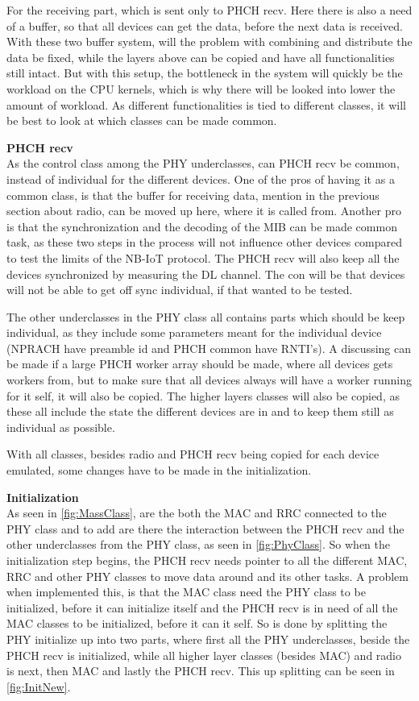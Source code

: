 For the receiving part, which is sent only to PHCH recv. Here there is also a need of a buffer, so that all devices can get the data, before the next data is received. 
With these two buffer system, will the problem with combining and distribute the data be fixed, while the layers above can be copied and have all functionalities still intact. But with this setup, the bottleneck in the system will quickly be the workload on the CPU kernels, which is why there will be looked into lower the amount of workload. As different functionalities is tied to different classes, it will be best to look at which classes can be made common.

\textbf{PHCH recv}\\
As the control class among the PHY underclasses, can PHCH recv be common, instead of individual for the different devices. One of the pros of having it as a common class, is that the buffer for receiving data, mention in the previous section about radio, can be moved up here, where it is called from. Another pro is that the synchronization and the decoding of the MIB can be made common task, as these two steps in the process will not influence other devices compared to test the limits of the NB-IoT protocol. The PHCH recv will also keep all the devices synchronized by measuring the DL channel. The con will be that devices will not be able to get off sync individual, if that wanted to be tested.

The other underclasses in the PHY class all contains parts which should be keep individual, as they include some parameters meant for the individual device (NPRACH have preamble id and PHCH common have RNTI's). A discussing can be made if a large PHCH worker array should be made, where all devices gets workers from, but to make sure that all devices always will have a worker running for it self, it will also be copied. The higher layers classes will also be copied, as these all include the state the different devices are in and to keep them still as individual as possible. 

With all classes, besides radio and PHCH recv being copied for each device emulated, some changes have to be made in the initialization.

\textbf{Initialization}\\
As seen in \autoref{fig:MassClass}, are the both the MAC and RRC connected to the PHY class and to add are there the interaction between the PHCH recv and the other underclasses from the PHY class, as seen in \autoref{fig:PhyClass}. So when the initialization step begins, the PHCH recv needs pointer to all the different MAC, RRC and other PHY classes to move data around and its other tasks. A problem when implemented this, is that the MAC class need the PHY class to be initialized, before it can initialize itself and the PHCH recv is in need of all the MAC classes to be initialized, before it can it self. So is done by splitting the PHY initialize up into two parts, where first all the PHY underclasses, beside the PHCH recv is initialized, while all higher layer classes (besides MAC) and radio is next, then MAC and lastly the PHCH recv. This up splitting can be seen in \autoref{fig:InitNew}.

